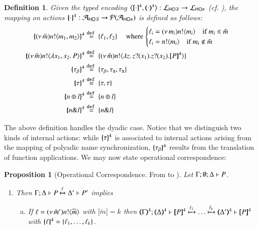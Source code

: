 \documentclass[preprint,11pt]{elsarticle}
\newtheorem{definition}{Definition}[section]
\newtheorem{proposition}{Proposition}[section]
\begin{document}
{{\begin{definition}
Given the typed encoding
	$\enco{\pmap{\cdot}{4}, \tmap{\cdot}{4}}: \tyl{L}_{\PHOp} \to \tyl{L}_{\HOp}$ (cf. ), 
	the mapping on actions 
$\{\!\!\{\cdot\}\!\!\}^{4}: \mathcal{A}_{\mathsf{HO}\,{\widetilde{\pi}}} \to \mathcal{P}(\mathcal{A}_{\mathsf{HO}\pi})$
is defined as follows:
	\begin{align*}
		\mapa{\news{\tilde{m}} \bactout{n}{m_1,  m_2}}^4 
		& \defeq \{\ell_1, \ell_2\} \quad
		\textrm{ where 
		$\begin{cases}
			\ell_i = \news{m_i}\bactout{n}{m_i} \quad \text{if $m_i \in \tilde{m}$} 
			\\
			\ell_i = \bactout{n}{m_i} \quad \text{if $m_i \not\in \tilde{m}$}
		\end{cases}$}
		\\
		\mapa{\news{\tilde{m}} \bactout{n}{\abs{x_1, x_2}{P}} }^4 
		& \defeq
		\{\news{\tilde{m}} \bactout{n}{\abs{z}\binp{z}{x_1} \binp{z}{x_2} \map{P}^{4}}\}
		\\
		\mapa{\btau}^4 & \defeq \{\btau, \stau,  \stau\}
		\\
		\mapa{\tau}^{4}  & \defeq \{\tau,\tau\}
		\\
		\mapa{\bactsel{n}{l}}^{4}  & \defeq \{\bactsel{n}{l}\}
		\\
		\mapa{\bactbra{n}{l}}^{4}  & \defeq \{\bactbra{n}{l}\}
	\end{align*}
\end{definition}
\noi The above definition handles the dyadic case. Notice that we distinguish two kinds of internal actions: while  $\{\!\!\{\tau\}\!\!\}^{4}$ is associated to internal actions arising from the mapping of polyadic name synchronization, 
 $\{\!\!\{\tau_{\beta}\}\!\!\}^4$ results from the translation of function applications. We may now state operational correspondence:

\begin{proposition}[Operational Correspondence. From \pHOp to \HOp]\myrm
	\label{prop:op_corr_pHOp_to_HOp}
Let $\Gamma; \emptyset; \Delta \vdash P$.
	\begin{enumerate}
		\item	 Then
			$\Gamma; \Delta \vdash P \xmapsto{\ell} \Delta' \vdash P'$ implies
%
			\begin{enumerate}[a)]
				\item	If $\ell = (\nu\, \tilde{m}') n ! \langle \widetilde{m} \rangle$ with $|\widetilde{m}| = k$ then
					$\horel{\tmap{\Gamma}{4}}{\tmap{\Delta}{4}}{\pmap{P}{4}}{\hby{\ell_1} \dots \hby{\ell_k}}{\tmap{\Delta'}{4}}{\pmap{P}{4}}$
					with $\{\!\!\{\ell\}\!\!\}^{4} = \{\ell_1, \dots, \ell_k\}$.


\end{enumerate}
\end{enumerate}
\end{proposition}}}
\end{document}
